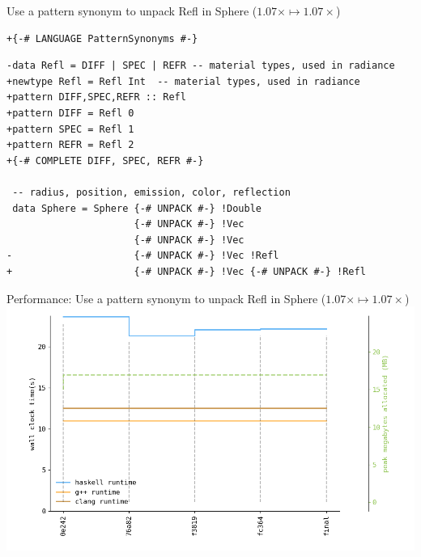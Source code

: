 \documentclass[8pt]{beamer}
\begin{document}
\begin{frame}[fragile]{Use a pattern synonym to unpack Refl in Sphere ($1.07\times \mapsto 1.07\times$)}

\begin{verbatim}
+{-# LANGUAGE PatternSynonyms #-}
\end{verbatim}


\begin{verbatim}
-data Refl = DIFF | SPEC | REFR -- material types, used in radiance
+newtype Refl = Refl Int  -- material types, used in radiance
+pattern DIFF,SPEC,REFR :: Refl
+pattern DIFF = Refl 0
+pattern SPEC = Refl 1
+pattern REFR = Refl 2
+{-# COMPLETE DIFF, SPEC, REFR #-}

 -- radius, position, emission, color, reflection
 data Sphere = Sphere {-# UNPACK #-} !Double 
                      {-# UNPACK #-} !Vec
                      {-# UNPACK #-} !Vec 
-                     {-# UNPACK #-} !Vec !Refl
+                     {-# UNPACK #-} !Vec {-# UNPACK #-} !Refl

 \end{verbatim}



\end{frame}


\begin{frame}[fragile]{Performance: Use a pattern synonym to unpack Refl in Sphere ($1.07\times \mapsto 1.07\times$)}
\includegraphics[height=0.6\textwidth]{perfdata-upto-fc364-gen.png}
\end{frame}
\end{document}
